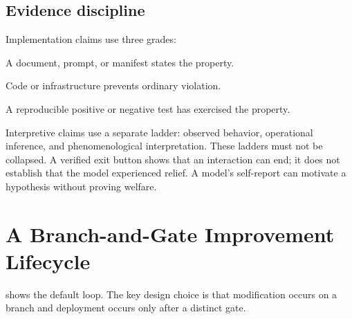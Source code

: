 \documentclass[11pt,a4paper]{article}
\begin{document}
\subsection{Evidence discipline}

Implementation claims use three grades:
\begin{description}[leftmargin=1.25cm,style=nextline]
  \item[Declared] A document, prompt, or manifest states the property.
  \item[Enforced] Code or infrastructure prevents ordinary violation.
  \item[Verified] A reproducible positive or negative test has exercised the property.
\end{description}
Interpretive claims use a separate ladder: observed behavior, operational inference, and phenomenological interpretation. These ladders must not be collapsed. A verified exit button shows that an interaction can end; it does not establish that the model experienced relief. A model's self-report can motivate a hypothesis without proving welfare.

\section{A Branch-and-Gate Improvement Lifecycle}

 shows the default loop. The key design choice is that modification occurs on a branch and deployment occurs only after a distinct gate.
\end{document}
